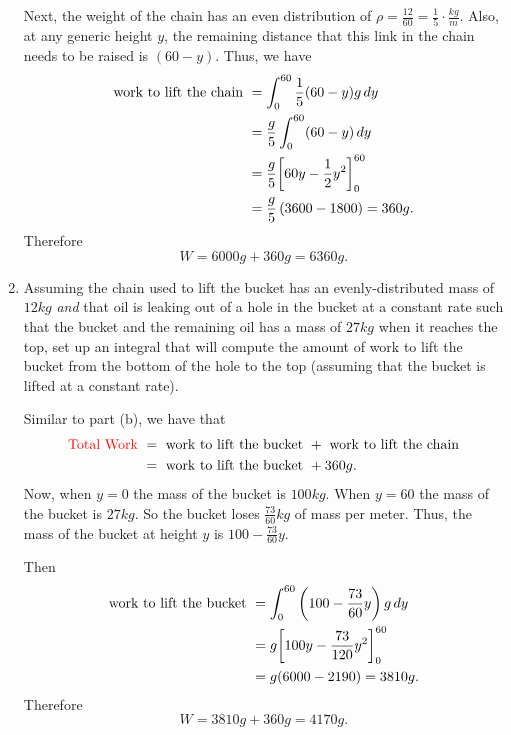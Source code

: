 \documentclass[noinstructornotes]{ximera}
\begin{document}
\begin{problem}
\begin{enumerate}
\begin{freeResponse}
		Next, the weight of the chain has an even distribution of $\rho = \frac{12}{60} = \frac{1}{5} \cdot \frac{kg}{m}$.  
		Also, at any generic height $y$, the remaining distance that this link in the chain needs to be raised is $(60-y)$.  
		Thus, we have
			\begin{align*}
			\text{work to lift the chain } &= \int_0^{60} \frac{1}{5} (60-y) g \,d y  \\
			&= \frac{g}{5} \int_0^{60} (60-y) \,d y  \\
			&= \frac{g}{5} \bigg[ 60y - \frac{1}{2} y^2 \bigg]_0^{60}  \\
			&= \frac{g}{5} \left( 3600 - 1800 \right) = 360g.
			\end{align*}
		Therefore
			\[
			W = 6000g + 360g = 6360g.
			\]
		\end{freeResponse}
		
		
		
		\item  Assuming the chain used to lift the bucket has an evenly-distributed mass of $12kg$ {\it and} that oil is leaking out of a hole in the bucket at a constant rate such that the bucket and the remaining oil has a mass of $27kg$ when it reaches the top, set up an integral that will compute the amount of work to lift the bucket from the bottom of the hole to the top (assuming that the bucket is lifted at a constant rate).
		\begin{freeResponse}
		Similar to part (b), we have that
			\begin{align*}
			\text{{\color{red}Total Work} } &= \text{ work to lift the bucket } + \text{ work to lift the chain}  \\
			&= \text{ work to lift the bucket } + 360g.
			\end{align*}
		Now, when $y=0$ the mass of the bucket is $100 kg$.  
		When $y=60$ the mass of the bucket is $27kg$.  
		So the bucket loses $\frac{73}{60} kg$ of mass per meter.  
		Thus, the mass of the bucket at height $y$ is $100 - \frac{73}{60} y$.  
		
		Then
			\begin{align*}
			\text{work to lift the bucket } &= \int_0^{60} \left(100 - \frac{73}{60} y \right) g \,d y  \\
			&= g \bigg[ 100y - \frac{73}{120} y^2  \bigg]_0^{60}  \\
			&= g (6000 - 2190) = 3810 g.
			\end{align*}
		Therefore
			\[
			W = 3810g + 360g = 4170g.
			\]
		\end{freeResponse}
		
	\end{enumerate}

\end{problem}
\end{document}
